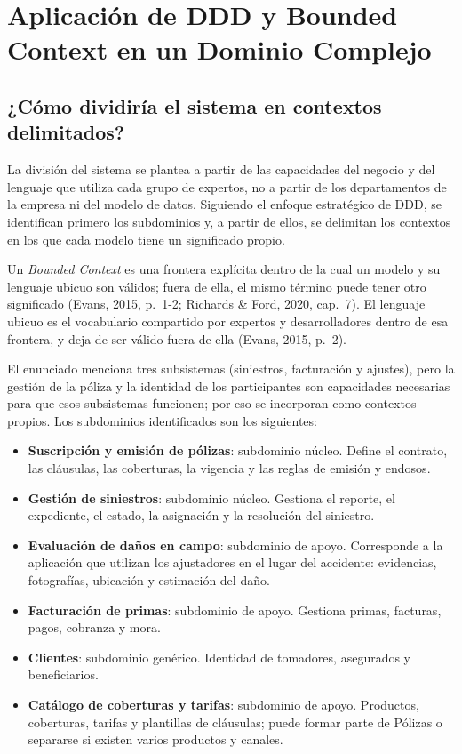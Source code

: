 \documentclass[12pt,a4paper]{article}
\begin{document}
\section{Aplicación de DDD y Bounded Context en un Dominio Complejo}

\subsection{¿Cómo dividiría el sistema en contextos delimitados?}

La división del sistema se plantea a partir de las capacidades del negocio y del lenguaje que utiliza cada grupo de expertos, no a partir de los departamentos de la empresa ni del modelo de datos. Siguiendo el enfoque estratégico de DDD, se identifican primero los subdominios y, a partir de ellos, se delimitan los contextos en los que cada modelo tiene un significado propio.

Un \textit{Bounded Context} es una frontera explícita dentro de la cual un modelo y su lenguaje ubicuo son válidos; fuera de ella, el mismo término puede tener otro significado (Evans, 2015, p.~1-2; Richards \& Ford, 2020, cap.~7). El lenguaje ubicuo es el vocabulario compartido por expertos y desarrolladores dentro de esa frontera, y deja de ser válido fuera de ella (Evans, 2015, p.~2).

El enunciado menciona tres subsistemas (siniestros, facturación y ajustes), pero la gestión de la póliza y la identidad de los participantes son capacidades necesarias para que esos subsistemas funcionen; por eso se incorporan como contextos propios. Los subdominios identificados son los siguientes:

\begin{itemize}[label=$\cdot$]
  \item \textbf{Suscripción y emisión de pólizas}: subdominio núcleo. Define el contrato, las cláusulas, las coberturas, la vigencia y las reglas de emisión y endosos.
  \item \textbf{Gestión de siniestros}: subdominio núcleo. Gestiona el reporte, el expediente, el estado, la asignación y la resolución del siniestro.
  \item \textbf{Evaluación de daños en campo}: subdominio de apoyo. Corresponde a la aplicación que utilizan los ajustadores en el lugar del accidente: evidencias, fotografías, ubicación y estimación del daño.
  \item \textbf{Facturación de primas}: subdominio de apoyo. Gestiona primas, facturas, pagos, cobranza y mora.
  \item \textbf{Clientes}: subdominio genérico. Identidad de tomadores, asegurados y beneficiarios.
  \item \textbf{Catálogo de coberturas y tarifas}: subdominio de apoyo. Productos, coberturas, tarifas y plantillas de cláusulas; puede formar parte de Pólizas o separarse si existen varios productos y canales.
\end{itemize}
\end{document}
